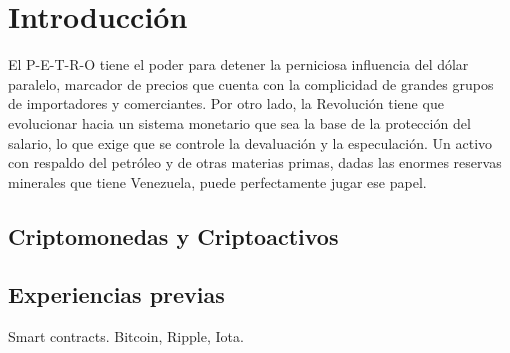 %
\section{Introducción}
\label{sec:intro}
%
El P-E-T-R-O tiene el poder para detener la perniciosa influencia del dólar paralelo, marcador de precios que cuenta con la complicidad de grandes grupos de importadores y comerciantes. Por otro lado, la Revolución tiene que evolucionar hacia un sistema monetario que sea la base de la protección del salario, lo que exige que se controle la devaluación y la especulación. Un activo con respaldo del petróleo y de otras materias primas, dadas las enormes reservas minerales que tiene Venezuela, puede perfectamente jugar ese papel.

\subsection{Criptomonedas y Criptoactivos}
\label{sec:cripto}

   
\subsection{Experiencias previas}
\label{sec:previous}

Smart contracts. Bitcoin, Ripple, Iota.

